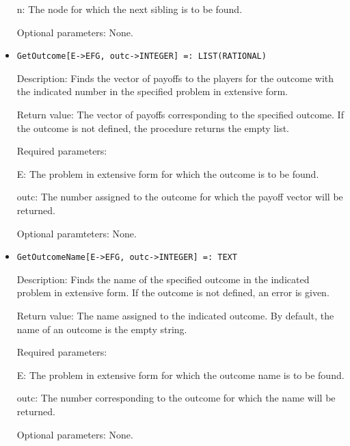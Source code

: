 \begin{itemize}
\bd
\item
[n:] The node for which the next sibling is to be found.
\ed

\item
[Optional parameters:] None.
\ed

\item
\protect \large \begin{verbatim}
GetOutcome[E->EFG, outc->INTEGER] =: LIST(RATIONAL)
\end{verbatim}\normalsize

\bd
\item
[Description:] Finds the vector of payoffs to the players for the
outcome with the indicated number in the specified problem in
extensive form.
\item
[Return value:] The vector of payoffs corresponding to the specified
outcome.  If the outcome is not defined, the procedure returns the
empty list.
\item
[Required parameters:]\hfil\null

\bd
\item
[E:] The problem in extensive form for which the outcome is to be
found.
\item
[outc:] The number assigned to the outcome for which the payoff vector
will be returned.
\ed

\item
[Optional paramteters:] None.
\ed

\item
\protect \large \begin{verbatim}
GetOutcomeName[E->EFG, outc->INTEGER] =: TEXT
\end{verbatim}\normalsize

\bd

\item
[Description:] Finds the name of the specified outcome in the
indicated problem in extensive form.  If the outcome is not defined,
an error is given.
\item
[Return value:] The name assigned to the indicated outcome.  By
default, the name of an outcome is the empty string.
\item
[Required parameters:]\hfil\null

\bd
\item	  
[E:] The problem in extensive form for which the outcome name is to be
found.
\item
[outc:] The number corresponding to the outcome for which the name
will be returned.
\ed

\item
[Optional parameters:] None.
\ed


\end{itemize}
